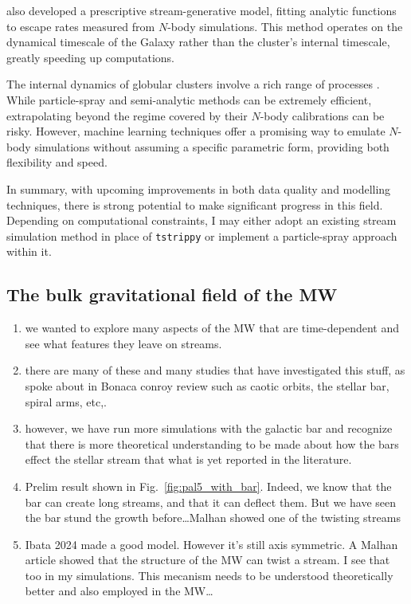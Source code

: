         \citet{2015MNRAS.452..301F} also developed a prescriptive stream-generative model, fitting analytic functions to escape rates measured from $N$-body simulations. This method operates on the dynamical timescale of the Galaxy rather than the cluster's internal timescale, greatly speeding up computations.  

        The internal dynamics of globular clusters involve a rich range of processes \citep{1997A&ARv...8....1M}. While particle-spray and semi-analytic methods can be extremely efficient, extrapolating beyond the regime covered by their $N$-body calibrations can be risky. However, machine learning techniques \citep{2023ApJ...959...99T} offer a promising way to emulate $N$-body simulations without assuming a specific parametric form, providing both flexibility and speed.

        In summary, with upcoming improvements in both data quality and modelling techniques, there is strong potential to make significant progress in this field. Depending on computational constraints, I may either adopt an existing stream simulation method in place of \texttt{tstrippy} or implement a particle-spray approach within it.

    \subsection{The bulk gravitational field of the MW}

            \begin{enumerate}
                \item we wanted to explore many aspects of the MW that are time-dependent and see what features they leave on streams. 
                \item there are many of these and many studies that have investigated this stuff, as spoke about in Bonaca conroy review such as caotic orbits, the stellar bar, spiral arms, etc,. 
                \item however, we have run more simulations with the galactic bar and recognize that there is more theoretical understanding to be made about how the bars effect the stellar stream that what is yet reported in the literature. 
                \item Prelim result shown in Fig.~\ref{fig:pal5_with_bar}. Indeed, we know that the bar can create long streams, and that it can deflect them. But we have seen the bar stund the growth before\dots Malhan showed one of the twisting streams 
                \item Ibata 2024 made a good model. However it's still axis symmetric. A Malhan article showed that the structure of the MW can twist a stream. I see that too in my simulations. This mecanism needs to be understood theoretically better and also employed in the MW\dots
            \end{enumerate}


